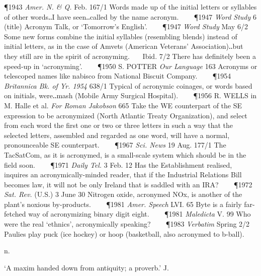 \begin{description}[wide, labelwidth=!, labelindent=0pt]
\P 1943 \textit{Amer. N. \& Q.} Feb. 167/1 Words made up of the initial letters or syllables of other words‥I have seen‥called by the name acronym.    
\P 1947 \textit{Word Study} 6 (title) Acronym Talk, or ‘Tomorrow's English’.    
\P 1947 \textit{Word Study} May 6/2 Some new forms combine the initial syllables (resembling blends) instead of initial letters, as in the case of Amvets (American Veterans' Association)‥but they still are in the spirit of acronyming.    Ibid. 7/2 There has definitely been a speed-up in ‘acronyming’.    
\P 1950 S. POTTER \textit{Our Language} 163 Acronyms or telescoped names like nabisco from National Biscuit Company.    
\P 1954 \textit{Britannica Bk. of Yr. 1954 } 638/1 Typical of acronymic coinages, or words based on initials, were‥mash (Mobile Army Surgical Hospital).    
\P 1956 R. WELLS in M. Halle et al. \textit{For Roman Jakobson} 665 Take the WE counterpart of the SE expression to be acronymized (North Atlantic Treaty Organization), and select from each word the first one or two or three letters in such a way that the selected letters, assembled and regarded as one word, will have a normal, pronounceable SE counterpart.    
\P 1967 \textit{Sci. News} 19 Aug. 177/1 The TacSatCom, as it is acronymed, is a small-scale system which should be in the field soon.    
\P 1971 \textit{Daily Tel.} 3 Feb. 12 Has the Establishment realised, inquires an acronymically-minded reader, that if the Industrial Relations Bill becomes law, it will not be only Ireland that is saddled with an IRA?    
\P 1972 \textit{Sat. Rev.} (U.S.) 3 June 30 Nitrogen oxide, acronymed NOx, is another of the plant's noxious by-products.    
\P 1981 \textit{Amer. Speech} LVI. 65 Byte is a fairly far-fetched way of acronymizing binary digit eight.    
\P 1981 \textit{Maledicta} V. 99 Who were the real ‘ethnics’, acronymically speaking?    
\P 1983 \textit{Verbatim} Spring 2/2 Paulies play puck (ice hockey) or hoop (basketball, also acronymed to b-ball).


  n.

\noindent  {}

\noindent  
[a. Fr. adage, ad. L. adagium a proverb, f. ad to + *agi- root of ajo = agio I say. (Fick I. 481.) A by-form was adagy.] 

\noindent ‘A maxim handed down from antiquity; a proverb.’ J. 


\end{description}
